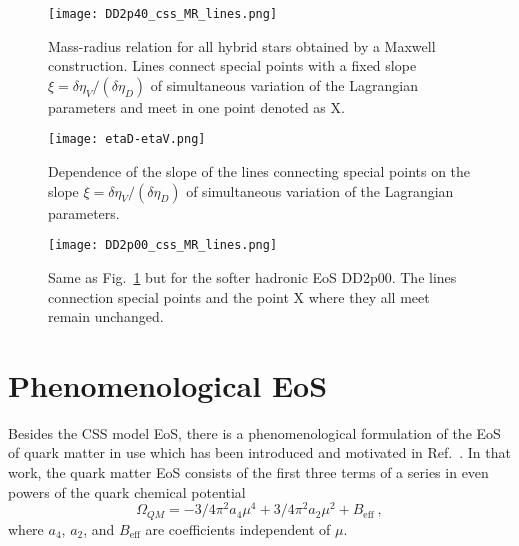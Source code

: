 \documentclass[%
 reprint,
superscriptaddress,
nofootinbib,
 amsmath,amssymb,
 aps,
]{revtex4-1}
\begin{document}
\begin{figure}[ht]
    \texttt{[image: DD2p40\_css\_MR\_lines.png]}
    \caption{Mass-radius relation for all hybrid stars obtained by a Maxwell construction. Lines connect special points with a fixed slope $\xi=\delta \eta_V/(\delta \eta_D)$ of simultaneous variation of the Lagrangian parameters and meet in one point denoted as X. }
    \label{fig:M-R_lines}
\end{figure}

\begin{figure}[ht]
    \texttt{[image: etaD-etaV.png]}
    \caption{Dependence of the slope of the lines connecting special points on the slope $\xi=\delta \eta_V/(\delta \eta_D)$ of simultaneous variation of the Lagrangian parameters.}
    \label{fig:etaD-etaV}
\end{figure}

\begin{figure}[ht]
    \texttt{[image: DD2p00\_css\_MR\_lines.png]}
    \caption{Same as Fig.~\ref{fig:M-R_lines} but for the softer hadronic EoS DD2p00. The lines connection special points and the point X where they all meet remain unchanged.}
    \label{fig:M-R_lines-2}
\end{figure}

\section{Phenomenological EoS}
\label{app:P-EoS}

Besides the CSS model EoS, there is a phenomenological  formulation of the EoS of quark matter in use which has been introduced and motivated in Ref.~\cite{Alford:2004pf}. 
In that work, the quark matter EoS consists of the first three terms of a series in even powers of the quark chemical potential
\begin{equation}
\label{eq:quartic}
\Omega_{QM}=-3/4\pi^2 a_4 \mu^4 + 3/4\pi^2 a_2 \mu^2 + B_{\textrm{eff}}~,
\end{equation}
where $a_4$, $a_2$, and $B_{\textrm{eff}}$ are coefficients independent of $\mu$.
\end{document}

